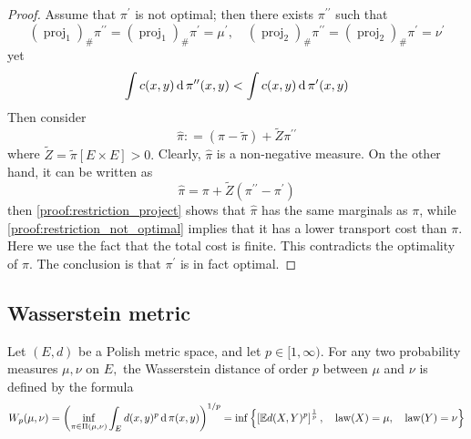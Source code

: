\begin{proof}
	Assume that \( \pi ^ { \prime } \) is not optimal;
	then there exists
	\( \pi ^ { \prime \prime } \) such that
	\begin{equation}
		\label{proof:restriction_project}
		\left( \operatorname { proj } _ { 1 } \right) _ { \# } \pi ^ { \prime \prime } = \left( \operatorname { proj } _ { 1 } \right) _ { \# } \pi ^ { \prime } = \mu ^ { \prime },
		\quad \left( \operatorname { proj } _ { 2 } \right) _ { \# } \pi ^ { \prime \prime } = \left( \operatorname { proj } _ { 2 } \right) _ { \# } \pi ^ { \prime } = \nu ^ { \prime }
	\end{equation}
	yet
	\begin{equation}
		\label{proof:restriction_not_optimal}
		\int c ( x , y ) \operatorname{d} \pi ^ { \prime \prime } ( x , y ) < \int c ( x , y ) \operatorname{d} \pi ^ { \prime } ( x , y )
	\end{equation}
	Then consider
	\[ \widehat { \pi } : = ( \pi - \widetilde { \pi } ) + \widetilde { Z } \pi ^ { \prime \prime } \]
	where \( \widetilde { Z } = \widetilde { \pi } [ E \times E ] > 0 . \) Clearly, \( \widehat { \pi } \) is a non-negative measure. On the
	other hand, it can be written as
	\[ \widehat { \pi } = \pi + \widetilde { Z } \left( \pi ^ { \prime \prime } - \pi ^ { \prime } \right) \]
	then \cref{proof:restriction_project} shows that \( \widehat { \pi } \) has the same marginals as \( \pi \),
	while \cref{proof:restriction_not_optimal} implies that it has a lower transport cost than \( \pi \).
	Here we use the fact that the total cost is finite.
	This contradicts the optimality of \( \pi \). The conclusion
	is that \( \pi ^ { \prime } \) is in fact optimal.
\end{proof}

\subsection{Wasserstein metric}

\begin{defn}
	\label{Wasserstein_distance}
	Let  \(( E , d ) \) be a Polish metric space, and let \( p \in [ 1 , \infty ) . \) For any two probability measures \( \mu , \nu \) on \( E , \) the Wasserstein distance of order \( p \) between \( \mu \) and \( \nu \) is defined by the formula
	\begin{align*}
		W _ { p } ( \mu , \nu ) 
		= \left( \inf _ { \pi \in \Pi ( \mu , \nu ) } \int _ { E } d ( x , y ) ^ { p } \operatorname{d} \pi ( x , y ) \right) ^ { 1 / p  } 
		= \inf \left\{ \left[ \mathbb{ E } d ( X , Y ) ^ { p } \right] ^ { \frac { 1 } { p } } , \quad \operatorname { law } ( X ) = \mu , \quad \operatorname { law } ( Y ) = \nu \right\}
	\end{align*}
\end{defn}

